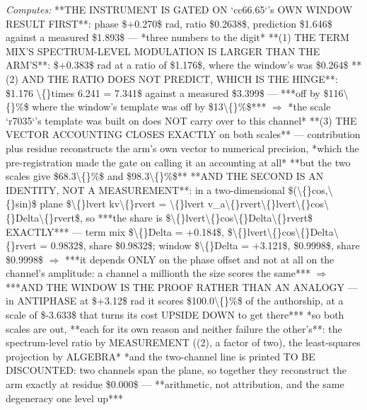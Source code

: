 \begin{description}
\emph{Computes:}  **THE INSTRUMENT IS GATED ON `cc66.65`'s OWN WINDOW RESULT FIRST**: phase \$+0.270\$ rad, ratio \$0.2638\$, prediction \$1.646\$ against a measured \$1.893\$ --- *three numbers to the digit*   **(1) THE TERM MIX'S SPECTRUM-LEVEL MODULATION IS LARGER THAN THE ARM'S**: \$+0.383\$ rad at a ratio of \$1.176\$, where the window's was \$0.264\$   **(2) AND THE RATIO DOES NOT PREDICT, WHICH IS THE HINGE**: \$1.176 \textbackslash\{\}times 6.241 = 7.341\$ against a measured \$3.399\$ --- ***off by \$116\textbackslash\{\}\%\$ where the window's template was off by \$13\textbackslash\{\}\%\$*** \ensuremath{\Rightarrow} *the scale `r7035`'s template was built on does NOT carry over to this channel*   **(3) THE VECTOR ACCOUNTING CLOSES EXACTLY on both scales** --- contribution plus residue reconstructs the arm's own vector to numerical precision, *which the pre-registration made the gate on calling it an accounting at all*  **but the two scales give \$68.3\textbackslash\{\}\%\$ and \$98.3\textbackslash\{\}\%\$**   **AND THE SECOND IS AN IDENTITY, NOT A MEASUREMENT**: in a two-dimensional \$(\textbackslash\{\}cos,\textbackslash\{\}sin)\$ plane \$\textbackslash\{\}lvert kv\textbackslash\{\}rvert = \textbackslash\{\}lvert v\_a\textbackslash\{\}rvert\textbackslash\{\}lvert\textbackslash\{\}cos\textbackslash\{\}Delta\textbackslash\{\}rvert\$, so ***the share is \$\textbackslash\{\}lvert\textbackslash\{\}cos\textbackslash\{\}Delta\textbackslash\{\}rvert\$ EXACTLY*** --- term mix \$\textbackslash\{\}Delta = +0.184\$, \$\textbackslash\{\}lvert\textbackslash\{\}cos\textbackslash\{\}Delta\textbackslash\{\}rvert = 0.9832\$, share \$0.9832\$; window \$\textbackslash\{\}Delta = +3.121\$, \$0.9998\$, share \$0.9998\$ \ensuremath{\Rightarrow} ***it depends ONLY on the phase offset and not at all on the channel's amplitude: a channel a millionth the size scores the same***  \ensuremath{\Rightarrow} ***AND THE WINDOW IS THE PROOF RATHER THAN AN ANALOGY --- in ANTIPHASE at \$+3.12\$ rad it scores \$100.0\textbackslash\{\}\%\$ of the authorship, at a scale of \$-3.633\$ that turns its cost UPSIDE DOWN to get there***   *so both scales are out, **each for its own reason and neither failure the other's**: the spectrum-level ratio by MEASUREMENT ((2), a factor of two), the least-squares projection by ALGEBRA*   *and the two-channel line is printed TO BE DISCOUNTED: two channels span the plane, so together they reconstruct the arm exactly at residue \$0.000\$ --- **arithmetic, not attribution, and the same degeneracy one level up***

\end{description}
